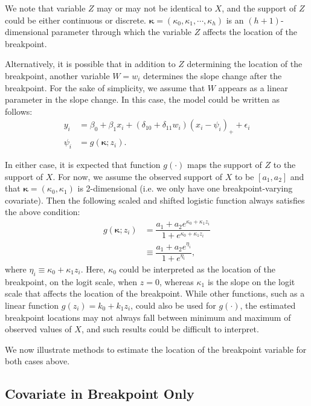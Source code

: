 \documentclass [12pt, proquest] {uwthesis}[2016/11/22]
\begin{document}
We note that variable $Z$ may or may not be identical to $X$, and the support of $Z$ could be either continuous or discrete. $\bm{\kappa} = (\kappa_0, \kappa_1, \cdots, \kappa_h)$ is an $(h+1)$-dimensional parameter through which the variable $Z$ affects the location of the breakpoint.

Alternatively, it is possible that in addition to $Z$ determining the location of the breakpoint, another variable $W = w_i$ determines the slope change after the breakpoint. For the sake of simplicity, we assume that $W$ appears as a linear parameter in the slope change. In this case, the model could be written as follows:
\begin{align}
    y_i &= \beta_0 + \beta_1 x_i + (\delta_{10} + \delta_{11} w_i) (x_i - \psi_i)_+ + \epsilon_i \\
    \psi_i &= g(\bm{\kappa}; z_i).
\end{align}

In either case, it is expected that function $g(\cdot)$ maps the support of $Z$ to the support of $X$. For now, we assume the observed support of $X$ to be $[a_1, a_2]$ and that $\bm{\kappa} = (\kappa_0, \kappa_1)$ is 2-dimensional (i.e. we only have one breakpoint-varying covariate). Then the following scaled and shifted logistic function always satisfies the above condition:
\begin{align}
    g(\bm{\kappa}; z_i) &= \dfrac{a_1 + a_2 e^{\kappa_0 + \kappa_1 z_i}}{1 + e^{\kappa_0 + \kappa_1 z_i}} \\
    &\equiv \dfrac{a_1 + a_2 e^{\eta_i}}{1 + e^{\eta_i}},
\end{align}
where $\eta_i \equiv \kappa_0 + \kappa_1 z_i$. Here, $\kappa_0$ could be interpreted as the location of the breakpoint, on the logit scale, when $z = 0$, whereas $\kappa_1$ is the slope on the logit scale that affects the location of the breakpoint. While other functions, such as a linear function $g(z_i) = k_0 + k_1 z_i$, could also be used for $g(\cdot)$, the estimated breakpoint locations may not always fall between minimum and maximum of observed values of $X$, and such results could be difficult to interpret.

We now illustrate methods to estimate the location of the breakpoint variable for both cases above.

\subsection{Covariate in Breakpoint Only}
\end{document}
